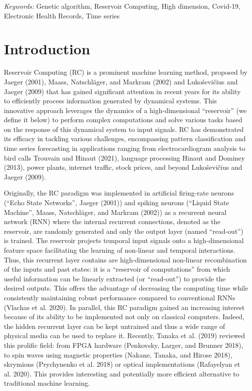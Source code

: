 \documentclass[
  11pt,
  a4paper,
]{article}
\renewcommand*\contentsname{Table of contents}
\newcommand\contentsname{Table of contents}
\theoremstyle{plain}
\theoremstyle{remark}
\begin{document}
\noindent%
{\it Keywords:} Genetic algorithm, Reservoir Computing, High
dimension, Covid-19, Electronic Health Records, Time series
\vfill

\linenumbers
{}


\renewcommand*\contentsname{Contents}
{
\hypersetup{linkcolor=}
\setcounter{tocdepth}{3}
\tableofcontents
}

\section{Introduction}\label{introduction}

Reservoir Computing (RC) is a prominent machine learning method,
proposed by Jaeger (2001), Maass, Natschläger, and Markram (2002) and
Lukoševičius and Jaeger (2009) that has gained significant attention in
recent years for its ability to efficiently process information
generated by dynamical systems. This innovative approach leverages the
dynamics of a high-dimensional ``reservoir'' (we define it below) to
perform complex computations and solve various tasks based on the
response of this dynamical system to input signals. RC has demonstrated
its efficacy in tackling various challenges, encompassing pattern
classification and time series forecasting in applications ranging from
electrocardiogram analysis to bird calls Trouvain and Hinaut (2021),
language processing Hinaut and Dominey (2013), power plants, internet
traffic, stock prices, and beyond Lukoševičius and Jaeger (2009).

Originally, the RC paradigm was implemented in artificial firing-rate
neurons (``Echo State Networks'', Jaeger (2001)) and spiking neurons
(``Liquid State Machine'', Maass, Natschläger, and Markram (2002)) as a
recurrent neural network (RNN) where the internal recurrent connections,
denoted as the reservoir, are randomly generated and only the output
layer (named ``read-out'') is trained. The reservoir projects temporal
input signals onto a high-dimensional feature space facilitating the
learning of non-linear and temporal interactions. Thus, this recurrent
layer contains are high-dimensional non-linear recombination of the
inputs and past states: it is a ``reservoir of computations'' from which
useful information can be linearly extracted (or ``read-out'') to
provide the desired outputs. This offers the advantage of decreasing the
computing time while consistently maintaining robust performance
compared to conventional RNNs (Vlachas et al. 2020). In parallel, this
RC paradigm gained an increasing interest because of its ability to be
implemented not only on classical computers. Indeed, the hidden
recurrent layer can be kept untrained and thus a wide range of physical
media can be used to replace it. Recently, Tanaka et al. (2019) reviewed
this prolific field: from FPGA hardware (Penkovsky, Larger, and Brunner
2018), to spin waves using magnetic properties (Nakane, Tanaka, and
Hirose 2018), skrymions (Prychynenko et al. 2018) or optical
implementations (Rafayelyan et al. 2020). This provides interesting and
potentially more efficient alternative to traditional machine learning.
\end{document}
